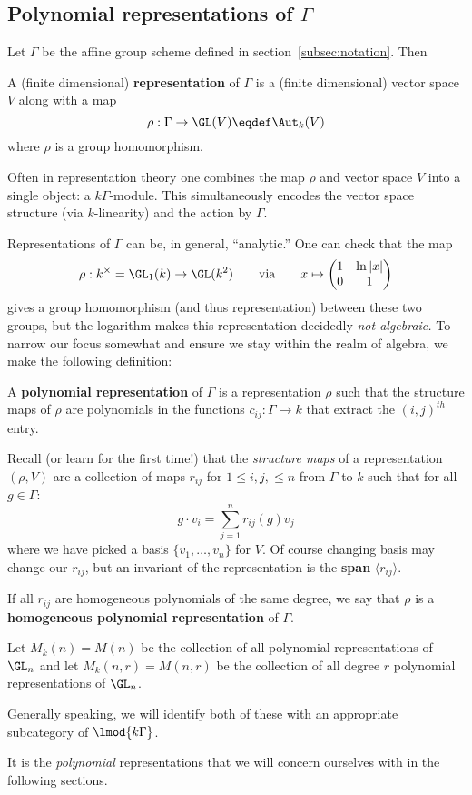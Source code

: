 \documentclass[12pt]{article}
\begin{document}
\subsection{Polynomial representations of \texorpdfstring{$\Gamma$}{Gamma}}
Let $\Gamma$ be the affine group scheme defined in section~\ref{subsec:notation}. Then 
\begin{defn}
	A (finite dimensional) \textbf{representation} of $\Gamma$ is a (finite dimensional) vector space $V$ along with a map
	\[\rho:\Gamma\to \GL(V)\eqdef\Aut_k(V)\]
	where $\rho$ is a group homomorphism.
\end{defn}
\begin{rmk}
	Often in representation theory one combines the map $\rho$ and vector space $V$ into a single object:
	a $k\Gamma$-module. This simultaneously encodes the vector space structure (via $k$-linearity) and the action by 
	$\Gamma$.
\end{rmk}
Representations of $\Gamma$ can be, in general, ``analytic.'' One can check that the map 
\[\rho:k^\times=\GL_1(k)\to \GL(k^2)\qquad\text{via}\qquad x\mapsto\begin{pmatrix}
	1 & \ln |x|\\ 0 & 1
\end{pmatrix}\]
gives a group homomorphism (and thus representation) between these two groups, but the logarithm makes this representation decidedly \textit{not algebraic.}
To narrow our focus somewhat and ensure we stay within the realm of algebra, we make the following definition:
\begin{defn}\label{def:poly-rep}
	A \textbf{polynomial representation} of $\Gamma$ is a representation $\rho$ such that the structure maps of $\rho$ 
	are polynomials in the functions $c_{ij}:\Gamma\to k$ that extract the $(i,j)^{th}$ entry.
\end{defn}
\begin{rmk}
	Recall (or learn for the first time!) that the \textit{structure maps} of a representation $(\rho,V)$ are a collection 
	of maps $r_{ij}$ for $1\le i,j,\le n$ from $\Gamma$ to $k$ such that for all $g\in \Gamma$:
	\[g\cdot v_i=\sum_{j=1}^n r_{ij}(g)v_j\]
	where we have picked a basis $\{v_1,\dots,v_n\}$ for $V$. Of course changing basis may change our 
	$r_{ij}$, but an invariant of the representation is the \textbf{span} $\langle r_{ij}\rangle$.
\end{rmk}
\begin{rmk}
	If all $r_{ij}$ are homogeneous polynomials of the same degree, we say that $\rho$ is a \textbf{homogeneous polynomial representation} of $\Gamma$.
\end{rmk}
\begin{defn}\label{def:Mnr}
	Let $M_k(n)=M(n)$ be the collection of all polynomial representations of $\GL_n$ and let $M_k(n,r)=M(n,r)$ 
	be the collection of all degree $r$ polynomial representations of $\GL_n$.

	Generally speaking, we will identify both of these with an appropriate subcategory of $\lmod{k\Gamma}$.
\end{defn}
It is the \textit{polynomial} representations that we will concern ourselves with in the following sections. 
\end{document}
